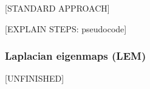 \documentclass[journal, a4paper]{IEEEtran}
\begin{document}

%
%
% 
%


[STANDARD APPROACH]

[EXPLAIN STEPS: pseudocode]






\hfill
\subsubsection{Laplacian eigenmaps (LEM)}
[UNFINISHED]
\end{document}
